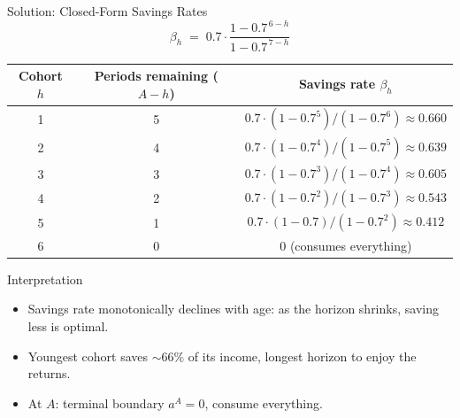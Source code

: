 \documentclass[aspectratio=169,11pt]{beamer}
\newcommand{\emphc}[1]{\textcolor{harvardcrimson}{#1}}
\begin{document}
\begin{frame}{\emphc{Solution:} Closed-Form Savings Rates}
\footnotesize
\[
\beta_h \;=\; 0.7 \cdot \frac{1 - 0.7^{\,6-h}}{1 - 0.7^{\,7-h}}
\]

\vspace{-0.1em}
\begin{center}\renewcommand{\arraystretch}{0.95}
\begin{tabular}{ccc}
\toprule
Cohort $h$ & Periods remaining ($A-h$) & Savings rate $\beta_h$\\
\midrule
1 & 5 & $0.7\cdot(1-0.7^5)/(1-0.7^6) \approx 0.660$ \\
2 & 4 & $0.7\cdot(1-0.7^4)/(1-0.7^5) \approx 0.639$ \\
3 & 3 & $0.7\cdot(1-0.7^3)/(1-0.7^4) \approx 0.605$ \\
4 & 2 & $0.7\cdot(1-0.7^2)/(1-0.7^3) \approx 0.543$ \\
5 & 1 & $0.7\cdot(1-0.7)/(1-0.7^2) \approx 0.412$ \\
6 & 0 & $0$ (consumes everything)\\
\bottomrule
\end{tabular}\end{center}

\vspace{-0.1em}
\begin{block}{Interpretation}
\vspace{-3pt}\begin{itemize}\itemsep0pt
    \item Savings rate \emphc{monotonically declines} with age: as the horizon shrinks, saving less is optimal.
    \item Youngest cohort saves \emphc{$\sim 66\%$} of its income, longest horizon to enjoy the returns.
    \item At $A$: terminal boundary $a^A = 0$, consume everything.
\end{itemize}
\end{block}
\end{frame}
\end{document}

